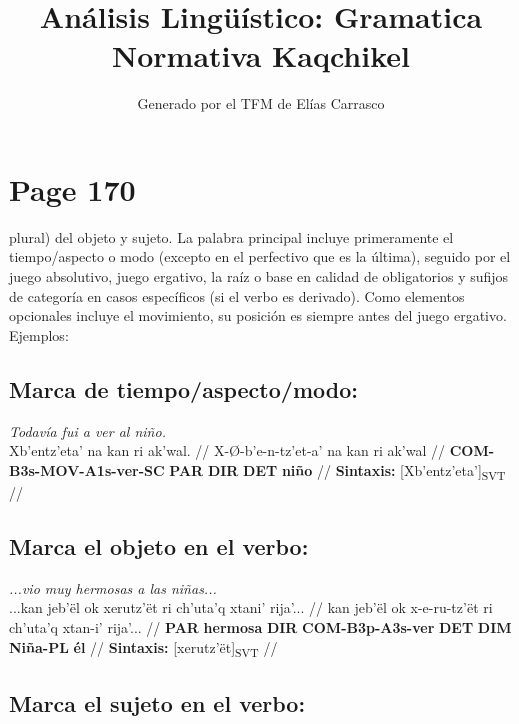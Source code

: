 \documentclass{article}%
\title{Análisis Lingüístico: Gramatica Normativa Kaqchikel}%
\author{Generado por el TFM de Elías Carrasco}%
\begin{document}
%
\normalsize%
\maketitle%
\section{Page 170}%
\label{sec:Page170}%
plural) del objeto y sujeto. La palabra principal incluye primeramente el tiempo/aspecto %
o modo (excepto en el perfectivo que es la última), seguido por el juego absolutivo, %
juego ergativo, la raíz o base en calidad de obligatorios y sufijos de categoría en casos %
específicos (si el verbo es derivado). Como elementos opcionales incluye el movimiento, %
su posición es siempre antes del juego ergativo. Ejemplos: %
\subsection{Marca de tiempo/aspecto/modo:}%
\label{subsec:Marcadetiempo/aspecto/modo}%

%
\par\medskip%
\ex
\textit{Todavía fui a ver al niño.} \\
\begingl
\gla Xb'entz'eta' na kan ri ak'wal. //
\glb X-Ø-b'e-n-tz'et-a' na kan ri ak'wal //
\glc \textbf{COM-}\textbf{B3s-}\textbf{MOV-}\textbf{A1s-}\textbf{ver-}\textbf{SC} \textbf{PAR} \textbf{DIR} \textbf{DET} \textbf{niño} //
\glft \textbf{Sintaxis:} [Xb'entz'eta']\textsubscript{SVT} //
\endgl
\xe
%
\medskip%
\subsection{Marca el objeto en el verbo:}%
\label{subsec:Marcaelobjetoenelverbo}%

%
\par\medskip%
\ex
\textit{...vio muy hermosas a las niñas...} \\
\begingl
\gla ...kan jeb'ël ok xerutz'ët ri ch'uta'q xtani' rija'... //
\glb kan jeb'ël ok x-e-ru-tz'ët ri ch'uta'q xtan-i' rija'... //
\glc \textbf{PAR} \textbf{hermosa} \textbf{DIR} \textbf{COM-}\textbf{B3p-}\textbf{A3s-}\textbf{ver} \textbf{DET} \textbf{DIM} \textbf{Niña-PL} \textbf{él} //
\glft \textbf{Sintaxis:} [xerutz'ët]\textsubscript{SVT} //
\endgl
\xe
%
\medskip%
\subsection{Marca el sujeto en el verbo:}%
\label{subsec:Marcaelsujetoenelverbo}%
\end{document}
